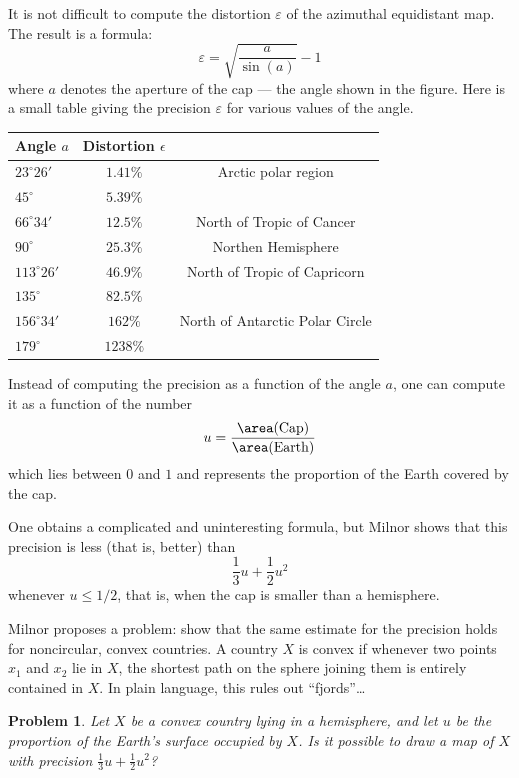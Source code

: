 \documentclass{amsart}
\newtheorem*{problem}{Problem}
\let\tmp\epsilon
\let\epsilon\varepsilon
\let\varepsilon\tmp
\begin{document}
It is not difficult to compute the distortion $\epsilon$ of the azimuthal
equidistant map. The result is a formula:
\[
  \epsilon = \sqrt{\frac{a}{\sin(a)}}-1
\]
where $a$ denotes the aperture of the cap --- the angle shown in the
figure. Here is a small table giving the precision $\epsilon$ for
various values of the angle.
\begin{center}
  \begin{tabular}{|l|c|c|}
    \hline
    Angle $a$ & Distortion $\epsilon$ &  \\
    \hline
     $23^{\circ}26'$ & $1.41\%$ & Arctic polar region \\
    \hline
     $45^{\circ}$ & $5.39\%$ &  \\
    \hline
     $66^{\circ}34'$ & $12.5\%$ & North of Tropic of Cancer \\
    \hline
     $90^{\circ}$ & $25.3\%$ &  Northen Hemisphere\\
    \hline
     $113^{\circ}26'$ & $46.9\%$ & North of Tropic of Capricorn \\
    \hline
     $135^{\circ}$ & $82.5\%$ &  \\
    \hline
     $156^{\circ}34'$ & $162\%$ & North of Antarctic Polar Circle \\
    \hline
     $179^{\circ}$ & $1238\%$ &  \\
    \hline
  \end{tabular}
\end{center}

Instead of computing the precision as a function of the angle $a$, one
can compute it as a function of the number
\[
  u = \frac{\area(\textrm{Cap})}{\area(\textrm{Earth})}
\]
which lies between $0$ and $1$ and represents the proportion of the
Earth covered by the cap.

One obtains a complicated and uninteresting formula, but Milnor shows
that this precision is less (that is, better) than 
\[
  \frac13 u + \frac12 u^2
\]
whenever $u \leq 1/2$, that is, when the cap is smaller than a
hemisphere.%

Milnor proposes a problem: show that the same estimate for the
precision holds for noncircular, convex countries. A country $X$ is
convex if whenever two points $x_1$ and $x_2$ lie in $X$, the shortest
path on the sphere joining them is entirely contained in $X$. In plain
language, this rules out ``fjords''\dots

\begin{problem}
  Let $X$ be a convex country lying in a hemisphere, and let $u$ be
  the proportion of the Earth’s surface occupied by $X$. Is it
  possible to draw a map of $X$ with precision
  $\frac13 u + \frac12 u^2$?
\end{problem}
\end{document}
